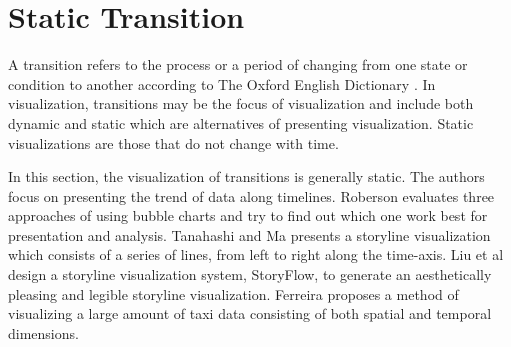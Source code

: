 \documentclass{egpubl}
\begin{document}
\section{Static Transition}
A transition refers to the process or a period of changing from one state or condition to another according to The Oxford English Dictionary \cite{transition}. In visualization, transitions may be the focus of visualization and include both dynamic and static which are alternatives of presenting visualization. Static visualizations are those that do not change with time. 

In this section, the visualization of transitions is generally static. The authors focus on presenting the trend of data along timelines. Roberson \cite{Rebortson} evaluates three approaches of using bubble charts and try to find out which one work best for presentation and analysis. Tanahashi and Ma \cite{Tanahashi} presents a storyline visualization which consists of a series of lines, from left to right along the time-axis.  Liu et al \cite{shixia} design a storyline visualization system, StoryFlow, to generate an aesthetically pleasing and legible storyline visualization. Ferreira \cite{ferreira2013} proposes a method of visualizing a large amount of taxi data consisting of both spatial and temporal dimensions.
\end{document}
